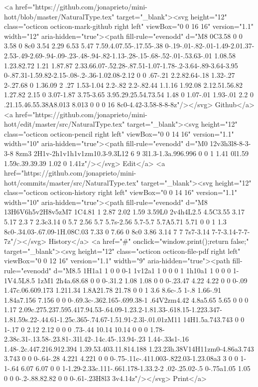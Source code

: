       <a href="https://github.com/jonaprieto/mini-hott/blob/master/NaturalType.tex" target="_blank"><svg height="12" class="octicon octicon-mark-github right left" viewBox="0 0 16 16" version="1.1" width="12" aria-hidden="true"><path fill-rule="evenodd" d="M8 0C3.58 0 0 3.58 0 8c0 3.54 2.29 6.53 5.47 7.59.4.07.55-.17.55-.38 0-.19-.01-.82-.01-1.49-2.01.37-2.53-.49-2.69-.94-.09-.23-.48-.94-.82-1.13-.28-.15-.68-.52-.01-.53.63-.01 1.08.58 1.23.82.72 1.21 1.87.87 2.33.66.07-.52.28-.87.51-1.07-1.78-.2-3.64-.89-3.64-3.95 0-.87.31-1.59.82-2.15-.08-.2-.36-1.02.08-2.12 0 0 .67-.21 2.2.82.64-.18 1.32-.27 2-.27.68 0 1.36.09 2 .27 1.53-1.04 2.2-.82 2.2-.82.44 1.1.16 1.92.08 2.12.51.56.82 1.27.82 2.15 0 3.07-1.87 3.75-3.65 3.95.29.25.54.73.54 1.48 0 1.07-.01 1.93-.01 2.2 0 .21.15.46.55.38A8.013 8.013 0 0 0 16 8c0-4.42-3.58-8-8-8z"/></svg> Github</a>
      <a href="https://github.com/jonaprieto/mini-hott/edit/master/src/NaturalType.tex" target="_blank"><svg height="12" class="octicon octicon-pencil right left" viewBox="0 0 14 16" version="1.1" width="10" aria-hidden="true"><path fill-rule="evenodd" d="M0 12v3h3l8-8-3-3-8 8zm3 2H1v-2h1v1h1v1zm10.3-9.3L12 6 9 3l1.3-1.3a.996.996 0 0 1 1.41 0l1.59 1.59c.39.39.39 1.02 0 1.41z"/></svg> Edit</a>
      <a href="https://github.com/jonaprieto/mini-hott/commits/master/src/NaturalType.tex" target="_blank"><svg height="12" class="octicon octicon-history right left" viewBox="0 0 14 16" version="1.1" width="10" aria-hidden="true"><path fill-rule="evenodd" d="M8 13H6V6h5v2H8v5zM7 1C4.81 1 2.87 2.02 1.59 3.59L0 2v4h4L2.5 4.5C3.55 3.17 5.17 2.3 7 2.3c3.14 0 5.7 2.56 5.7 5.7s-2.56 5.7-5.7 5.7A5.71 5.71 0 0 1 1.3 8c0-.34.03-.67.09-1H.08C.03 7.33 0 7.66 0 8c0 3.86 3.14 7 7 7s7-3.14 7-7-3.14-7-7-7z"/></svg> History</a>
      <a  href="#" onclick="window.print();return false;" target="_blank"><svg height="12" class="octicon octicon-file-pdf right left" viewBox="0 0 12 16" version="1.1" width="9" aria-hidden="true"><path fill-rule="evenodd" d="M8.5 1H1a1 1 0 0 0-1 1v12a1 1 0 0 0 1 1h10a1 1 0 0 0 1-1V4.5L8.5 1zM1 2h4a.68.68 0 0 0-.31.2 1.08 1.08 0 0 0-.23.47 4.22 4.22 0 0 0-.09 1.47c.06.609.173 1.211.34 1.8A21.78 21.78 0 0 1 3.6 8.6c-.5 1-.8 1.66-.91 1.84a7.156 7.156 0 0 0-.69.3c-.362.165-.699.38-1 .64V2zm4.42 4.8a5.65 5.65 0 0 0 1.17 2.09c.275.237.595.417.94.53-.64.09-1.23.2-1.81.33-.618.15-1.223.347-1.81.59s.22-.44.61-1.25c.365-.74.67-1.51.91-2.3l-.01.01zM11 14H1.5a.743.743 0 0 1-.17 0 2.12 2.12 0 0 0 .73-.44 10.14 10.14 0 0 0 1.78-2.38c.31-.13.58-.23.81-.31l.42-.14c.45-.13.94-.23 1.44-.33s1-.16 1.48-.2c.447.216.912.394 1.39.53.403.11.814.188 1.23.23h.38V14H11zm0-4.86a3.743 3.743 0 0 0-.64-.28 4.221 4.221 0 0 0-.75-.11c-.411.003-.822.03-1.23.08a3 3 0 0 1-1-.64 6.07 6.07 0 0 1-1.29-2.33c.111-.661.178-1.33.2-2 .02-.25.02-.5 0-.75a1.05 1.05 0 0 0-.2-.88.82.82 0 0 0-.61-.23H8l3 3v4.14z"/></svg> Print</a>

